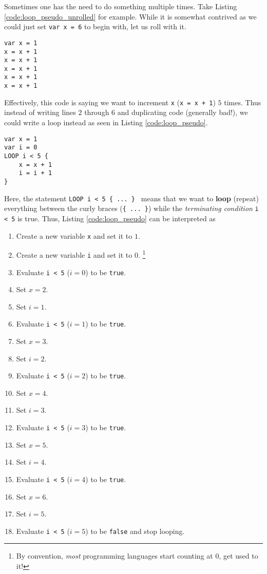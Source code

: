 \documentclass{article}
\begin{document}
Sometimes one has the need to do something multiple times.
Take Listing \ref{code:loop_pseudo_unrolled} for example.
While it is somewhat contrived as we could just set \lstinline{var x = 6} to begin with, let us roll with it.
\begin{lstlisting}[caption={Unless you know what are you doing (you don't), don't do this.}, label={code:loop_pseudo_unrolled}]
var x = 1
x = x + 1
x = x + 1
x = x + 1
x = x + 1
x = x + 1
\end{lstlisting}
Effectively, this code is saying we want to increment \lstinline{x} (\lstinline{x = x + 1}) $5$ times.
Thus instead of writing lines $2$ through $6$ and duplicating code (generally bad!), we could write a loop instead as seen in Listing \ref{code:loop_pseudo}.
\begin{lstlisting}[caption={Loops are cool.}, label={code:loop_pseudo}]
var x = 1
var i = 0
LOOP i < 5 {
    x = x + 1
    i = i + 1
}
\end{lstlisting}
Here, the statement \lstinline|LOOP i < 5 { ... } | means that we want to \textbf{loop} (repeat) everything between the curly braces (\lstinline|{ ... }|) while the \textit{terminating condition} \lstinline{i < 5} is true.
Thus, Listing \ref{code:loop_pseudo} can be interpreted as
\begin{enumerate}
\item Create a new variable \lstinline{x} and set it to $1$.
\item Create a new variable \lstinline{i} and set it to $0$. \footnote{By convention, \textit{most} programming languages start counting at $0$, get used to it!}
\item Evaluate \lstinline{i < 5} ($i = 0$) to be \lstinline{true}.
\item Set $x = 2$.
\item Set $i = 1$.
\item Evaluate \lstinline{i < 5} ($i = 1$) to be \lstinline{true}.
\item Set $x = 3$.
\item Set $i = 2$.
\item Evaluate \lstinline{i < 5} ($i = 2$) to be \lstinline{true}.
\item Set $x = 4$.
\item Set $i = 3$.
\item Evaluate \lstinline{i < 5} ($i = 3$) to be \lstinline{true}.
\item Set $x = 5$.
\item Set $i = 4$.
\item Evaluate \lstinline{i < 5} ($i = 4$) to be \lstinline{true}.
\item Set $x = 6$.
\item Set $i = 5$.
\item Evaluate \lstinline{i < 5} ($i = 5$) to be \lstinline{false} and stop looping.
\end{enumerate}
\end{document}
